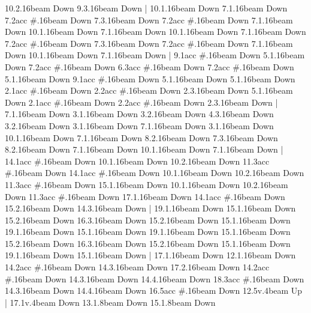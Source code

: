       10.2.16{beam Down}
      9.3.16{beam Down}
    |
      10.1.16{beam Down}
      7.1.16{beam Down}
      7.2{acc #}.16{beam Down}
      7.3.16{beam Down}
      7.2{acc #}.16{beam Down}
      7.1.16{beam Down}
      10.1.16{beam Down}
      7.1.16{beam Down}
      10.1.16{beam Down}
      7.1.16{beam Down}
      7.2{acc #}.16{beam Down}
      7.3.16{beam Down}
      7.2{acc #}.16{beam Down}
      7.1.16{beam Down}
      10.1.16{beam Down}
      7.1.16{beam Down}
    |
      9.1{acc #}.16{beam Down}
      5.1.16{beam Down}
      7.2{acc #}.16{beam Down}
      6.3{acc #}.16{beam Down}
      7.2{acc #}.16{beam Down}
      5.1.16{beam Down}
      9.1{acc #}.16{beam Down}
      5.1.16{beam Down}
      5.1.16{beam Down}
      2.1{acc #}.16{beam Down}
      2.2{acc #}.16{beam Down}
      2.3.16{beam Down}
      5.1.16{beam Down}
      2.1{acc #}.16{beam Down}
      2.2{acc #}.16{beam Down}
      2.3.16{beam Down}
    |
      7.1.16{beam Down}
      3.1.16{beam Down}
      3.2.16{beam Down}
      4.3.16{beam Down}
      3.2.16{beam Down}
      3.1.16{beam Down}
      7.1.16{beam Down}
      3.1.16{beam Down}
      10.1.16{beam Down}
      7.1.16{beam Down}
      8.2.16{beam Down}
      7.3.16{beam Down}
      8.2.16{beam Down}
      7.1.16{beam Down}
      10.1.16{beam Down}
      7.1.16{beam Down}
    |
      14.1{acc #}.16{beam Down}
      10.1.16{beam Down}
      10.2.16{beam Down}
      11.3{acc #}.16{beam Down}
      14.1{acc #}.16{beam Down}
      10.1.16{beam Down}
      10.2.16{beam Down}
      11.3{acc #}.16{beam Down}
      15.1.16{beam Down}
      10.1.16{beam Down}
      10.2.16{beam Down}
      11.3{acc #}.16{beam Down}
      17.1.16{beam Down}
      14.1{acc #}.16{beam Down}
      15.2.16{beam Down}
      14.3.16{beam Down}
    |
      19.1.16{beam Down}
      15.1.16{beam Down}
      15.2.16{beam Down}
      16.3.16{beam Down}
      15.2.16{beam Down}
      15.1.16{beam Down}
      19.1.16{beam Down}
      15.1.16{beam Down}
      19.1.16{beam Down}
      15.1.16{beam Down}
      15.2.16{beam Down}
      16.3.16{beam Down}
      15.2.16{beam Down}
      15.1.16{beam Down}
      19.1.16{beam Down}
      15.1.16{beam Down}
    |
      17.1.16{beam Down}
      12.1.16{beam Down}
      14.2{acc #}.16{beam Down}
      14.3.16{beam Down}
      17.2.16{beam Down}
      14.2{acc #}.16{beam Down}
      14.3.16{beam Down}
      14.4.16{beam Down}
      18.3{acc #}.16{beam Down}
      14.3.16{beam Down}
      14.4.16{beam Down}
      16.5{acc #}.16{beam Down}
      12.5{v}.4{beam Up}
    |
      17.1{v}.4{beam Down}
      13.1.8{beam Down}
      15.1.8{beam Down}
